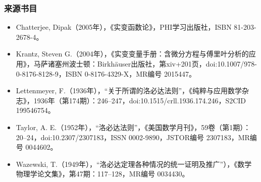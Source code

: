 \subsubsection{来源书目}
\begin{itemize}
\item Chatterjee, Dipak（2005年），《实变函数论》，PHI学习出版社，ISBN 81-203-2678-4。
\item Krantz, Steven G.（2004年），《实变变量手册：含微分方程与傅里叶分析的应用》，马萨诸塞州波士顿：Birkhäuser出版社，第xiv+201页，doi:10.1007/978-0-8176-8128-9，ISBN 0-8176-4329-X，MR编号 2015447。
\item Lettenmeyer, F.（1936年），“关于所谓的洛必达法则”，《纯粹与应用数学杂志》，1936年（第174期）：246–247，doi:10.1515/crll.1936.174.246，S2CID 199546754。
\item Taylor, A. E.（1952年），“洛必达法则”，《美国数学月刊》，59卷（第1期）：20–24，doi:10.2307/2307183，ISSN 0002-9890，JSTOR编号 2307183，MR编号 0044602。
\item Wazewski, T.（1949年），“洛必达定理各种情况的统一证明及推广”），《数学物理学论文集》，第47期：117–128，MR编号 0034430。
\end{itemize}